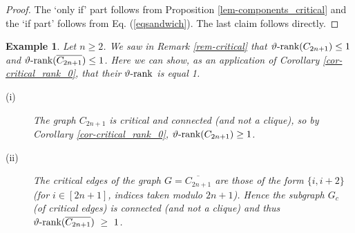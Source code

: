 \documentclass[11pt]{article}
\newtheorem{example}[theorem]{Example}
\numberwithin{equation}{section}
\newcommand{\rrank}{\vartheta\text{\rm -rank}}
\begin{document}
\begin{proof} The `only if' part follows from  Proposition \ref{lem-components_critical} and the `if part' follows from Eq. (\ref{eqsandwich}). The last claim follows directly.
\end{proof}

\begin{example}\label{rk-odd-compl}
 Let $n\geq 2$. We  saw in Remark \ref{rem-critical} that $\rrank(C_{2n+1})\leq 1$ and $\rrank(\overline{C_{2n+1}})\leq 1$. Here we can show, as an application of Corollary \ref{cor-critical_rank_0},  that their $\rrank$ is equal 1.
\begin{description}
\item [(i)] The graph $C_{2n+1}$ is critical and connected (and not a clique), so by Corollary \ref{cor-critical_rank_0}, $\rrank(C_{2n+1})\geq 1$.
\item [(ii)] The critical edges of the graph $G=\overline{C_{2n+1}}$ are those of the form $\{i,i+2\}$ (for $i\in [2n+1]$, indices taken modulo $2n+1$). Hence the subgraph $G_c$ (of critical edges) is connected (and not a clique) and thus $\rrank(\overline{C_{2n+1}})~\geq~1$. 
\end{description}
\end{example}
 
\end{document}
